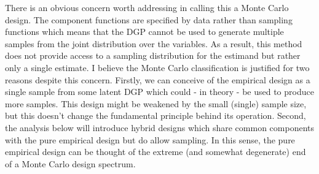 \documentclass[../main.tex]{subfiles}
\begin{document}
\vspace{\baselineskip}
There is an obvious concern worth addressing in calling this a Monte Carlo design. The component functions are specified by data rather than sampling functions which means that the DGP cannot be used to generate multiple samples from the joint distribution over the variables. As a result, this method does not provide access to a sampling distribution for the estimand but rather only a single estimate. I believe the Monte Carlo classification is justified for two reasons despite this concern. Firstly, we can conceive of the empirical design as a single sample from some latent DGP which could - in theory - be used to produce more samples. This design might be weakened by the small (single) sample size, but this doesn’t change the fundamental principle behind its operation. Second, the analysis below will introduce hybrid designs which share common components with the pure empirical design but do allow sampling. In this sense, the pure empirical design can be thought of the extreme (and somewhat degenerate) end of a Monte Carlo design spectrum.\par

\vspace{\baselineskip}
\end{document}
